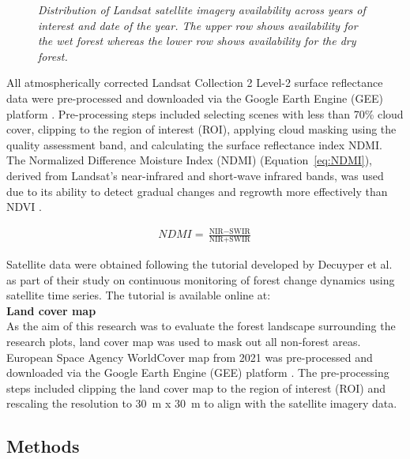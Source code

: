 \begin{figure}[h]
\caption{\textit{Distribution of Landsat satellite imagery availability across years of interest and date of the year. The upper row shows availability for the wet forest whereas the lower row shows availability for the dry forest.}}
\label{fig:satellite}
\end{figure}


All atmospherically corrected Landsat Collection 2 Level-2 surface reflectance data were pre-processed and downloaded via the Google Earth Engine (GEE) platform \citep{gorelickGoogleEarthEngine2017}. Pre-processing steps included selecting scenes with less than 70\% cloud cover, clipping to the region of interest (ROI), applying cloud masking using the quality assessment band, and calculating the surface reflectance index NDMI. The Normalized Difference Moisture Index (NDMI) (Equation~\ref{eq:NDMI}), derived from Landsat's near-infrared and short-wave infrared bands, was used due to its ability to detect gradual changes and regrowth more effectively than NDVI \citep{vermotePreliminaryAnalysisPerformance2016}.

\begin{align}
\label{eq:NDMI}
NDMI = \frac{\text{NIR} - \text{SWIR}}{\text{NIR} + \text{SWIR}}
\end{align}

Satellite data were obtained following the tutorial developed by Decuyper et al. as part of their study on continuous monitoring of forest change dynamics using satellite time series. The tutorial is available online at:
\href{https://www.pucv.cl/uuaa/labgrs/proyectos/tutorial-to-the-anomaly-vegetation-change-detection-avocado}\\

\textbf{Land cover map}\\

As the aim of this research was to evaluate the forest landscape surrounding the research plots, land cover map was used to mask out all non-forest areas. European Space Agency WorldCover map from 2021 was pre-processed and downloaded via the Google Earth Engine (GEE) platform \citep{gorelickGoogleEarthEngine2017, zanagaESAWorldCover102022}. The pre-processing steps included clipping the land cover map to the region of interest (ROI) and rescaling the resolution to 30~m x 30~m to align with the satellite imagery data. 

\subsection{Methods}

